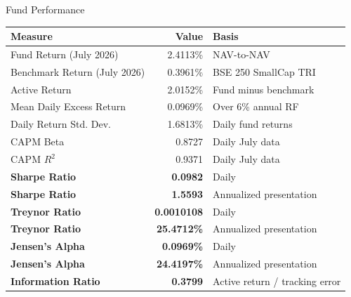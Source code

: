 \documentclass[11pt, aspectratio=43]{beamer}
\begin{document}
\begin{frame}{Fund Performance}
\centering
\small
\begin{tabular}{l r l}
\toprule
\textbf{Measure} & \textbf{Value} & \textbf{Basis} \\
\midrule
Fund Return (July 2026) & 2.4113\% & NAV-to-NAV \\
Benchmark Return (July 2026) & 0.3961\% & BSE 250 SmallCap TRI \\
Active Return & 2.0152\% & Fund minus benchmark \\
Mean Daily Excess Return & 0.0969\% & Over 6\% annual RF \\
Daily Return Std. Dev. & 1.6813\% & Daily fund returns \\
CAPM Beta & 0.8727 & Daily July data \\
CAPM $R^2$ & 0.9371 & Daily July data \\
\midrule
\textbf{Sharpe Ratio} & \textbf{0.0982} & Daily \\
\textbf{Sharpe Ratio} & \textbf{1.5593} & Annualized presentation \\
\textbf{Treynor Ratio} & \textbf{0.0010108} & Daily \\
\textbf{Treynor Ratio} & \textbf{25.4712\%} & Annualized presentation \\
\textbf{Jensen's Alpha} & \textbf{0.0969\%} & Daily \\
\textbf{Jensen's Alpha} & \textbf{24.4197\%} & Annualized presentation \\
\textbf{Information Ratio} & \textbf{0.3799} & Active return / tracking error \\
\bottomrule
\end{tabular}

\vspace{0.4em}
\footnotesize
\end{frame}
\end{document}
